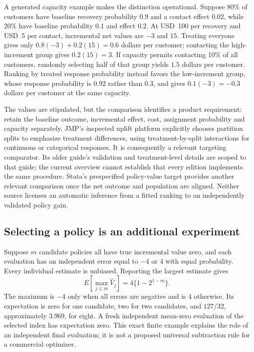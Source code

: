 A generated capacity example makes the distinction operational. Suppose
80\% of customers have baseline recovery probability $0.9$ and a contact
effect $0.02$, while 20\% have baseline probability $0.1$ and effect $0.2$.
At USD~100 per recovery and USD~5 per contact, incremental net values are
$-3$ and $15$. Treating everyone gives only
$0.8(-3)+0.2(15)=0.6$ dollars per customer; contacting the high-increment
group gives $0.2(15)=3$. If capacity permits contacting 10\% of all customers,
randomly selecting half of that group yields $1.5$ dollars per customer.
Ranking by treated response probability instead favors the low-increment
group, whose response probability is $0.92$ rather than $0.3$, and gives
$0.1(-3)=-0.3$ dollars per customer at the same capacity.
\citep{exec16_cp_exact}

The values are stipulated, but the comparison identifies a product requirement:
retain the baseline outcome, incremental effect, cost, assignment probability
and capacity separately. JMP's inspected uplift platform explicitly chooses
partition splits to emphasize treatment differences, using treatment-by-split
interactions for continuous or categorical responses. It is consequently a
relevant targeting comparator. Its older guide's validation and treatment-level
details are scoped to that guide; the current overview cannot establish that
every edition implements the same procedure. Stata's prespecified policy-value
target provides another relevant comparison once the net outcome and population
are aligned. Neither source licenses an automatic inference from a fitted
ranking to an independently validated policy gain. \citep{exec13_ch_jmp_uplift,exec13_ch_stata}

\subsection{Selecting a policy is an additional experiment}

Suppose $m$ candidate policies all have true incremental value zero, and each
evaluation has an independent error equal to $-4$ or $4$ with equal probability.
Every individual estimate is unbiased. Reporting the largest estimate gives
\[
 E\left[\max_{j\leq m}\widehat V_j\right]
 =4\{1-2^{1-m}\}.
\]
The maximum is $-4$ only when all errors are negative and is $4$ otherwise.
Its expectation is zero for one candidate, two for two candidates, and
$127/32$, approximately $3.969$, for eight. A fresh independent mean-zero
evaluation of the selected index has expectation zero. This exact finite
example explains the role of an independent final evaluation; it is not a
proposed universal subtraction rule for a commercial optimizer.
\citep{exec16_cp_exact}

